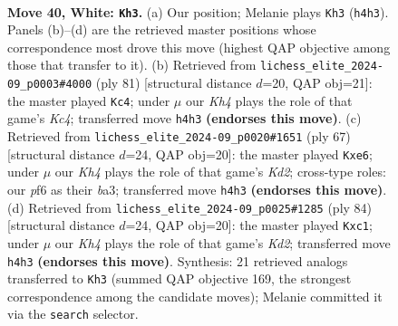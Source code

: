 \documentclass[11pt]{article}
\begin{document}
\clearpage

\begin{figure}[p]\centering
\begin{subfigure}{0.46\textwidth}\centering
\resizebox{\linewidth}{!}{%
\newchessgame
\chessboard[
  setfen={7k/p2p4/2p2p2/6r1/1P1P3K/8/5P1P/8 w - - 0 40},
  showmover=false,
  pgfstyle=straightmove, color=movearrow, markmove={h4-h3}
]}
\caption{}
\end{subfigure}\hfill
\begin{subfigure}{0.46\textwidth}\centering
\resizebox{\linewidth}{!}{%
\newchessgame
\chessboard[
  setfen={8/5p2/1R3P1p/P1k2p2/8/1p4Pp/7P/4K3 b - - 1 41},
  showmover=false,
  pgfstyle=straightmove, color=movearrow, markmove={c5-c4}
]}
\caption{}
\end{subfigure}
\\[4pt]
\begin{subfigure}{0.46\textwidth}\centering
\resizebox{\linewidth}{!}{%
\newchessgame
\chessboard[
  setfen={8/1ppk3p/4R3/8/p7/BP6/P2K1P1P/8 b - - 0 34},
  showmover=false,
  pgfstyle=straightmove, color=movearrow, markmove={d7-e6}
]}
\caption{}
\end{subfigure}\hfill
\begin{subfigure}{0.46\textwidth}\centering
\resizebox{\linewidth}{!}{%
\newchessgame
\chessboard[
  setfen={8/7p/1p4p1/1P1k4/4p3/6PP/3K1P2/2r5 w - - 0 43},
  showmover=false,
  pgfstyle=straightmove, color=movearrow, markmove={d2-c1}
]}
\caption{}
\end{subfigure}
\caption{\textbf{Move 40, White: \texttt{Kh3}.} (a) Our position; Melanie plays \texttt{Kh3} (\texttt{h4h3}). Panels (b)--(d) are the retrieved master positions whose correspondence most drove this move (highest QAP objective among those that transfer to it). (b) Retrieved from \texttt{lichess\_elite\_2024-09\_p0003\#4000} (ply 81) [structural distance $d$=20, QAP obj=21]: the master played \texttt{Kc4}; under $\mu$ our \emph{Kh4} plays the role of that game's \emph{Kc4}; transferred move \texttt{h4h3} \textbf{(endorses this move)}. (c) Retrieved from \texttt{lichess\_elite\_2024-09\_p0020\#1651} (ply 67) [structural distance $d$=24, QAP obj=20]: the master played \texttt{Kxe6}; under $\mu$ our \emph{Kh4} plays the role of that game's \emph{Kd2}; cross-type roles: our \emph{p}f6 as their \emph{b}a3; transferred move \texttt{h4h3} \textbf{(endorses this move)}. (d) Retrieved from \texttt{lichess\_elite\_2024-09\_p0025\#1285} (ply 84) [structural distance $d$=24, QAP obj=20]: the master played \texttt{Kxc1}; under $\mu$ our \emph{Kh4} plays the role of that game's \emph{Kd2}; transferred move \texttt{h4h3} \textbf{(endorses this move)}. Synthesis: 21 retrieved analogs transferred to \texttt{Kh3} (summed QAP objective 169, the strongest correspondence among the candidate moves); Melanie committed it via the \texttt{search} selector.}
\label{fig:thought-m78}
\end{figure}
\end{document}
